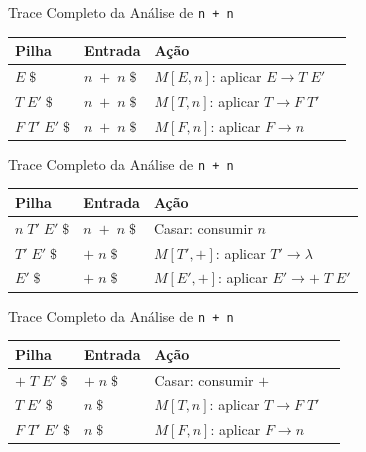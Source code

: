 \begin{frame}{Trace Completo da Análise de
    \texttt{n + n}}

    \begin{table}
        \begin{tabular}{l l l l}
            \hline
            Pilha & Entrada & Ação \\
            \hline
            \(E\;\$\) & \(n\;+\;n\;\$\) & \(M[E,n]\): aplicar \(E \to T\;E'\) \\
            \(T\;E'\;\$\) & \(n\;+\;n\;\$\) & \(M[T,n]\): aplicar \(T \to F\;T'\) \\
            \(F\;T'\;E'\;\$\) & \(n\;+\;n\;\$\) & \(M[F,n]\): aplicar \(F \to n\) \\
            \hline
        \end{tabular}
    \end{table}
\end{frame}

\begin{frame}{Trace Completo da Análise de
    \texttt{n + n}}

    \begin{table}
        \begin{tabular}{l l l}
            \hline
            Pilha & Entrada & Ação \\
    \hline
    \(n\;T'\;E'\;\$\) & \(n\;+\;n\;\$\) & Casar: consumir \(n\) \\
    \(T'\;E'\;\$\) & \(+\;n\;\$\) & \(M[T',+]\): aplicar
    \(T' \to \lambda\) \\
    \(E'\;\$\) & \(+\;n\;\$\) & \(M[E',+]\): aplicar \(E' \to +\;T\;E'\) \\
    \hline
\end{tabular}
\end{table}
\end{frame}

\begin{frame}{Trace Completo da Análise de
    \texttt{n + n}}

    \begin{table}
        \begin{tabular}{l l l l}
            \hline
            Pilha & Entrada & Ação \\
            \hline
            \(+\;T\;E'\;\$\) & \(+\;n\;\$\) & Casar: consumir \(+\) \\
            \(T\;E'\;\$\) & \(n\;\$\) & \(M[T,n]\): aplicar \(T \to F\;T'\) \\
            \(F\;T'\;E'\;\$\) & \(n\;\$\) & \(M[F,n]\): aplicar \(F \to n\) \\
            \hline
        \end{tabular}
    \end{table}
\end{frame}

